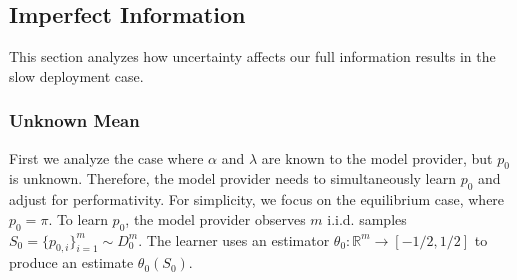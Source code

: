 \subsection{Imperfect Information}
\label{sec:imperf-one-slow}

This section analyzes how uncertainty affects our full information results in
the slow deployment case. 

\subsubsection{Unknown Mean}

First we analyze the case where $\alpha$ and $\lambda$ are known to the
model provider, but $p_0$ is unknown. Therefore, the model provider needs to simultaneously learn $p_0$ and adjust for performativity. For simplicity, we focus on the equilibrium
case, where $p_0 = \pi$. To learn $p_0$, the model provider observes $m$ i.i.d.
samples $S_0 = \{p_{0, i} \}_{i=1}^m \sim D_0^m$. The learner uses an estimator
$\theta_0\colon \mathbb{R}^m \to [-1/2, 1/2]$ to produce an estimate
$\theta_0(S_0)$.


